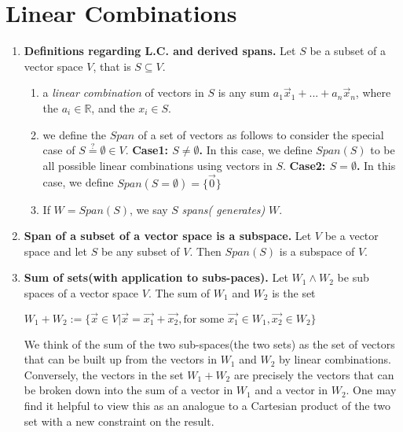 \documentclass[12pt]{book}
\newcommand{\settag}[1]{\renewcommand{\theenumi}{#1}}
\newcommand{\R}{\mathbb{R}}
\begin{document}
\section{Linear Combinations}
    \begin{enumerate}
        \settag{1.3.1}
        \item \textbf{Definitions regarding L.C. and derived spans.} Let $S$ be a subset of a vector space $V$, that is $S\subseteq V$.
        \begin{enumerate}
            \item a \textit{linear combination} of vectors in $S$ is any sum $a_1\vec{x}_1 + ... + a_n\vec{x}_n$, where the $a_i \in \R$, and the $x_i \in S$.
            \item we define the $Span$ of a set of vectors as follows to consider the special case of $S\stackrel{?}{=}\emptyset \in V$.
            \textbf{Case1: $S\neq \emptyset$.} In this case, we define $Span(S)$ to be all possible linear combinations using vectors in $S$.
            \textbf{Case2: $S= \emptyset$.} In this case, we define $Span(S = \emptyset)=\{\vec{0}\}$
            
            \item If $W=Span(S)$, we say $S$ \textit{spans( generates)} $W$.
        \end{enumerate}
        
        \settag{1.3.4}
        \item \textbf{Span of a  subset of a vector space is a subspace.} Let $V$ be a vector space and let $S$ be any subset of $V$. Then $Span(S)$ is a subspace of $V$.
        
        \settag{1.3.5}
        \item \textbf{Sum of sets(with application to subs-paces).} Let $W_1\wedge W_2$ be sub spaces of a vector space $V$. The sum of $W_1$ and $W_2$ is the set
        \begin{center}
            $W_1+W_2 :=\{\vec{x}\in V |\vec{x}=\vec{x_1}+\vec{x_2}, \text{for some } \vec{x_1}\in W_1, \vec{x_2} \in W_2\}$
        \end{center}
        We think of the sum of the two sub-spaces(the two sets) as the set of vectors that can be built up from the vectors in $W_1$ and $W_2$ by linear combinations. Conversely, the vectors in the set $W_1+W_2$ are precisely the vectors that can be broken down into the sum of a vector in $W_1$ and a vector in $W_2$. One may find it helpful to view this as an analogue to a Cartesian product of the two set with a new constraint on the result.
        

\end{enumerate}
\end{document}

